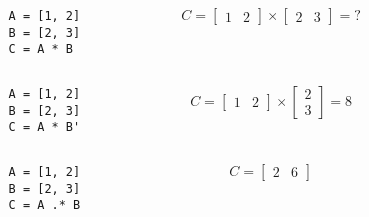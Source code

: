 \begin{frame}[fragile]
  \begin{example}[Matrisoperationer]
    \begin{columns}
      \begin{column}{0.4\columnwidth}
        \begin{verbatim}
          A = [1, 2]
          B = [2, 3]
          C = A * B
        \end{verbatim}
      \end{column}
      \begin{column}{0.4\columnwidth}
        \( C =
        \begin{bmatrix}1 & 2\end{bmatrix}\times
        \begin{bmatrix}2 & 3\end{bmatrix} = ?
        \)
      \end{column}
    \end{columns}
    \begin{columns}
      \begin{column}{0.4\columnwidth}
        \begin{verbatim}
          A = [1, 2]
          B = [2, 3]
          C = A * B'
        \end{verbatim}
      \end{column}
      \begin{column}{0.4\columnwidth}
        \( C =
        \begin{bmatrix}1 & 2\end{bmatrix}\times
        \begin{bmatrix}2 \\ 3\end{bmatrix} = 8
        \)
      \end{column}
    \end{columns}
    \begin{columns}
      \begin{column}{0.4\columnwidth}
        \begin{verbatim}
          A = [1, 2]
          B = [2, 3]
          C = A .* B
        \end{verbatim}
      \end{column}
      \begin{column}{0.4\columnwidth}
        \( C =
        \begin{bmatrix}2 & 6\end{bmatrix}
        \)
      \end{column}
    \end{columns}
  \end{example}
\end{frame}

